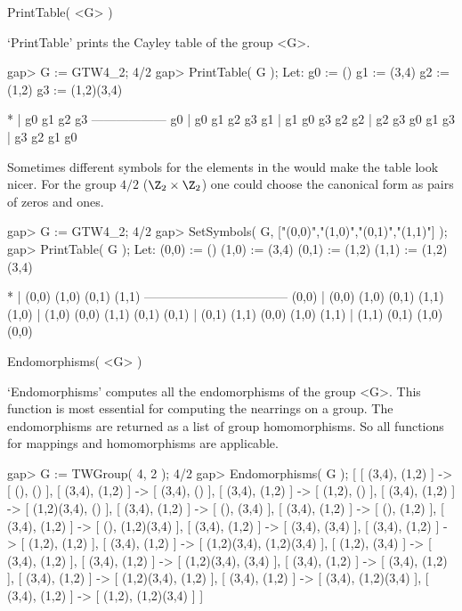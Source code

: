 

\>PrintTable( <G> )

`PrintTable' prints the Cayley table of the group <G>.

\beginexample
    gap> G := GTW4_2;
    4/2
    gap> PrintTable( G );
    Let:
    g0 := ()
    g1 := (3,4)
    g2 := (1,2)
    g3 := (1,2)(3,4)

      *  | g0 g1 g2 g3 
     ------------------
      g0 | g0 g1 g2 g3 
      g1 | g1 g0 g3 g2 
      g2 | g2 g3 g0 g1 
      g3 | g3 g2 g1 g0 

\endexample

Sometimes different symbols for the elements in the would make the table
look nicer. For the group $4/2$ ($\Z_2 \times \Z_2$) one could choose
the canonical form as pairs of zeros and ones.

\beginexample
    gap> G := GTW4_2;
    4/2
    gap> SetSymbols( G, ["(0,0)","(1,0)","(0,1)","(1,1)"] );
    gap> PrintTable( G );
    Let:
    (0,0) := ()
    (1,0) := (3,4)
    (0,1) := (1,2)
    (1,1) := (1,2)(3,4)

          *  | (0,0)  (1,0)  (0,1)  (1,1)  
      -----------------------------------
      (0,0)  | (0,0)  (1,0)  (0,1)  (1,1)  
      (1,0)  | (1,0)  (0,0)  (1,1)  (0,1)  
      (0,1)  | (0,1)  (1,1)  (0,0)  (1,0)  
      (1,1)  | (1,1)  (0,1)  (1,0)  (0,0)  
\endexample



\>Endomorphisms( <G> )

`Endomorphisms' computes all the endomorphisms of the group <G>. 
This function is most essential for computing the nearrings on a group.
The endomorphisms are returned as a list of group homomorphisms. So all
functions for mappings and homomorphisms are applicable.

\beginexample
    gap> G := TWGroup( 4, 2 );
    4/2
    gap> Endomorphisms( G );
    [ [ (3,4), (1,2) ] -> [ (), () ], [ (3,4), (1,2) ] -> [ (3,4), () ],
      [ (3,4), (1,2) ] -> [ (1,2), () ], 
      [ (3,4), (1,2) ] -> [ (1,2)(3,4), () ], 
      [ (3,4), (1,2) ] -> [ (), (3,4) ], 
      [ (3,4), (1,2) ] -> [ (), (1,2) ], 
      [ (3,4), (1,2) ] -> [ (), (1,2)(3,4) ], 
      [ (3,4), (1,2) ] -> [ (3,4), (3,4) ], 
      [ (3,4), (1,2) ] -> [ (1,2), (1,2) ], 
      [ (3,4), (1,2) ] -> [ (1,2)(3,4), (1,2)(3,4) ], 
      [ (1,2), (3,4) ] -> [ (3,4), (1,2) ], 
      [ (3,4), (1,2) ] -> [ (1,2)(3,4), (3,4) ], 
      [ (3,4), (1,2) ] -> [ (3,4), (1,2) ], 
      [ (3,4), (1,2) ] -> [ (1,2)(3,4), (1,2) ], 
      [ (3,4), (1,2) ] -> [ (3,4), (1,2)(3,4) ], 
      [ (3,4), (1,2) ] -> [ (1,2), (1,2)(3,4) ] ]
\endexample


